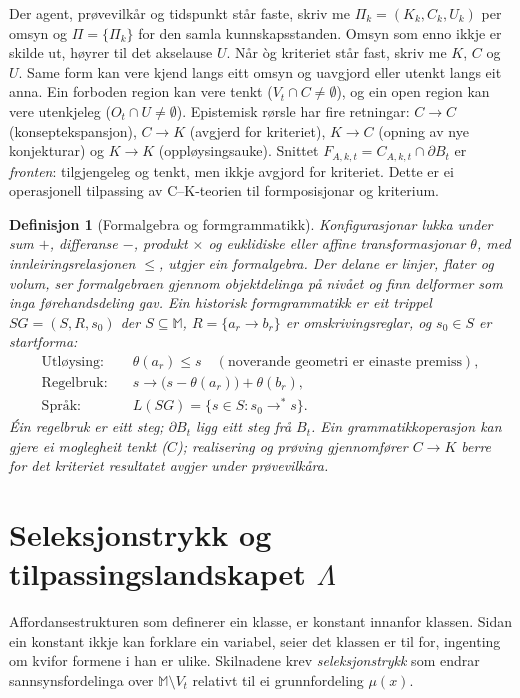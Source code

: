 \documentclass[9pt,twocolumn,a4paper]{article}
\theoremstyle{defstyle}
\newtheorem{definisjon}{Definisjon}
\theoremstyle{formstyle}
\begin{document}
Der agent, prøvevilkår og tidspunkt står faste, skriv me $\Pi_k=(K_k,C_k,U_k)$ per omsyn og $\Pi=\{\Pi_k\}$ for den samla kunnskapsstanden. Omsyn som enno ikkje er skilde ut, høyrer til det akselause $U$. Når òg kriteriet står fast, skriv me $K$, $C$ og $U$. Same form kan vere kjend langs eitt omsyn og uavgjord eller utenkt langs eit anna. Ein forboden region kan vere tenkt ($V_t \cap C \neq \emptyset$), og ein open region kan vere utenkjeleg ($O_t \cap U \neq \emptyset$). Epistemisk rørsle har fire retningar: $C \to C$ (konseptekspansjon), $C \to K$ (avgjerd for kriteriet), $K \to C$ (opning av nye konjekturar) og $K \to K$ (oppløysingsauke). Snittet $F_{A,k,t} = C_{A,k,t} \cap \partial B_t$ er \emph{fronten}: tilgjengeleg og tenkt, men ikkje avgjord for kriteriet. Dette er ei operasjonell tilpassing av C--K-teorien til formposisjonar og kriterium.

\begin{definisjon}[Formalgebra og formgrammatikk]
Konfigurasjonar lukka under sum $+$, differanse $-$, produkt $\times$ og euklidiske eller affine transformasjonar $\theta$, med innleiringsrelasjonen $\leq$, utgjer ein \emph{formalgebra}. Der delane er linjer, flater og volum, ser formalgebraen gjennom objektdelinga på nivået og finn delformer som inga førehandsdeling gav. Ein historisk \emph{formgrammatikk} er eit trippel $SG = (S, R, s_0)$ der $S \subseteq \mathbb{M}$, $R = \{a_r \to b_r\}$ er omskrivingsreglar, og $s_0 \in S$ er startforma:
\begin{align*}
\text{Utløysing:} &\quad \theta(a_r) \leq s \quad (\text{noverande geometri er einaste premiss}), \\
\text{Regelbruk:} &\quad s \to \big(s - \theta(a_r)\big) + \theta(b_r), \\
\text{Språk:} &\quad L(SG) = \{s \in S : s_0 \to^* s\}.
\end{align*}
Éin regelbruk er eitt steg; $\partial B_t$ ligg eitt steg frå $B_t$. Ein grammatikkoperasjon kan gjere ei moglegheit tenkt ($C$); realisering og prøving gjennomfører $C \to K$ berre for det kriteriet resultatet avgjer under prøvevilkåra.
\end{definisjon}

\section{Seleksjonstrykk og tilpassingslandskapet $\Lambda$}

Affordansestrukturen som definerer ein klasse, er konstant innanfor klassen. Sidan ein konstant ikkje kan forklare ein variabel, seier det klassen er til for, ingenting om kvifor formene i han er ulike. Skilnadene krev \emph{seleksjonstrykk} som endrar sannsynsfordelinga over $\mathbb{M} \setminus V_t$ relativt til ei grunnfordeling $\mu(x)$.
\end{document}

